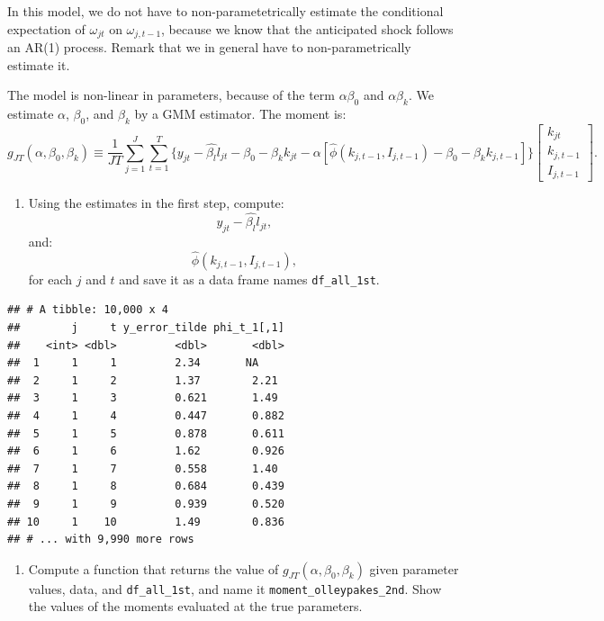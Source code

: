 \documentclass[
]{book}
\providecommand{\tightlist}{%
  \setlength{\itemsep}{0pt}\setlength{\parskip}{0pt}}
\begin{document}
In this model, we do not have to non-parametetrically estimate the conditional expectation of \(\omega_{jt}\) on \(\omega_{j, t - 1}\), because we know that the anticipated shock follows an AR(1) process. Remark that we in general have to non-parametrically estimate it.

The model is non-linear in parameters, because of the term \(\alpha \beta_0\) and \(\alpha \beta_k\). We estimate \(\alpha\), \(\beta_0\), and \(\beta_k\) by a GMM estimator. The moment is:
\[
g_{JT}(\alpha, \beta_0, \beta_k) \equiv \frac{1}{JT}\sum_{j = 1}^J \sum_{t = 1}^T \{y_{jt} - \hat{\beta_l} l_{jt} - \beta_0 - \beta_k k_{jt} - \alpha[\hat{\phi}(k_{j, t - 1}, I_{j, t - 1}) - \beta_0 - \beta_k k_{j, t-1}]\} 
\begin{bmatrix}
k_{jt} \\
k_{j, t - 1} \\
I_{j, t - 1}
\end{bmatrix}.
\]

\begin{enumerate}
\def\labelenumi{\arabic{enumi}.}
\setcounter{enumi}{4}
\tightlist
\item
  Using the estimates in the first step, compute:
  \[
  y_{jt} - \hat{\beta_l} l_{jt},
  \]
  and:
  \[
  \hat{\phi}(k_{j, t - 1}, I_{j, t - 1}),
  \]
  for each \(j\) and \(t\) and save it as a data frame names \texttt{df\_all\_1st}.
\end{enumerate}

\begin{verbatim}
## # A tibble: 10,000 x 4
##        j     t y_error_tilde phi_t_1[,1]
##    <int> <dbl>         <dbl>       <dbl>
##  1     1     1         2.34       NA    
##  2     1     2         1.37        2.21 
##  3     1     3         0.621       1.49 
##  4     1     4         0.447       0.882
##  5     1     5         0.878       0.611
##  6     1     6         1.62        0.926
##  7     1     7         0.558       1.40 
##  8     1     8         0.684       0.439
##  9     1     9         0.939       0.520
## 10     1    10         1.49        0.836
## # ... with 9,990 more rows
\end{verbatim}

\begin{enumerate}
\def\labelenumi{\arabic{enumi}.}
\setcounter{enumi}{5}
\tightlist
\item
  Compute a function that returns the value of \(g_{JT}(\alpha, \beta_0, \beta_k)\) given parameter values, data, and \texttt{df\_all\_1st}, and name it \texttt{moment\_olleypakes\_2nd}. Show the values of the moments evaluated at the true parameters.
\end{enumerate}
\end{document}
